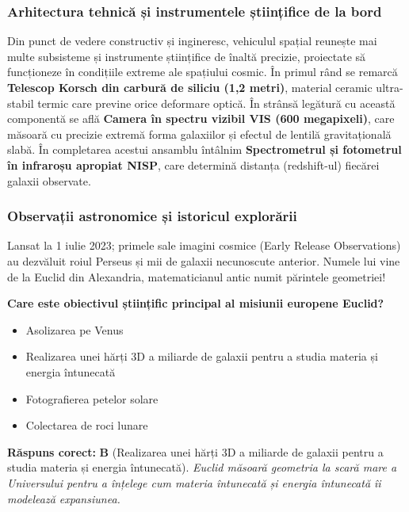 \subsubsection*{Arhitectura tehnică și instrumentele științifice de la bord}
Din punct de vedere constructiv și ingineresc, vehiculul spațial reunește mai multe subsisteme și instrumente științifice de înaltă precizie, proiectate să funcționeze în condițiile extreme ale spațiului cosmic. În primul rând se remarcă \textbf{Telescop Korsch din carbură de siliciu (1,2 metri)}, material ceramic ultra-stabil termic care previne orice deformare optică. În strânsă legătură cu această componentă se află \textbf{Camera în spectru vizibil VIS (600 megapixeli)}, care măsoară cu precizie extremă forma galaxiilor și efectul de lentilă gravitațională slabă. În completarea acestui ansamblu întâlnim \textbf{Spectrometrul și fotometrul în infraroșu apropiat NISP}, care determină distanța (redshift-ul) fiecărei galaxii observate.

\subsubsection*{Observații astronomice și istoricul explorării}
Lansat la 1 iulie 2023; primele sale imagini cosmice (\guillemotleft{}Early Release Observations\guillemotright{}) au dezvăluit roiul Perseus și mii de galaxii necunoscute anterior. Numele lui vine de la Euclid din Alexandria, matematicianul antic numit \guillemotleft{}părintele geometriei\guillemotright{}!

\vspace{6pt}
\begin{tcolorbox}[orbitarquiz, title={\textbf{Întrebare de verificare \#46: Telescopul Spațial Euclid}}]
\textbf{Care este obiectivul științific principal al misiunii europene Euclid?}
\begin{itemize}[leftmargin=2.2em, itemsep=2pt, topsep=4pt]
  \item[$\square$ \textbf{A.}] Asolizarea pe Venus
  \item[$\square$ \textbf{B.}] Realizarea unei hărți 3D a miliarde de galaxii pentru a studia materia și energia întunecată
  \item[$\square$ \textbf{C.}] Fotografierea petelor solare
  \item[$\square$ \textbf{D.}] Colectarea de roci lunare
\end{itemize}
\vspace{2pt}
{\footnotesize\color{orbitarMuted}\textbf{Răspuns corect:} \textbf{B} (Realizarea unei hărți 3D a miliarde de galaxii pentru a studia materia și energia întunecată). \emph{Euclid măsoară geometria la scară mare a Universului pentru a înțelege cum materia întunecată și energia întunecată îi modelează expansiunea.}}
\end{tcolorbox}
\clearpage


